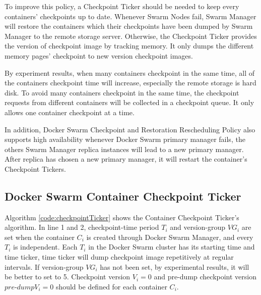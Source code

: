 To improve this policy, a Checkpoint Ticker should be needed to keep every containers' checkpoints up to date.
Whenever Swarm Nodes fail, Swarm Manager will restore the containers which their checkpoints have been dumped by Swarm Manager to the remote storage server.
Otherwise, the Checkpoint Ticker provides the version of checkpoint image by tracking memory. It only dumps the different memory pages' checkpoint to new version checkpoint images.

By experiment results, when many containers checkpoint in the same time, all of the containers checkpoint time will increase, especially the remote storage is hard disk.
To avoid many containers checkpoint in the same time, the checkpoint requests from different containers will be collected in a checkpoint queue.
It only allows one container checkpoint at a time.

In addition, Docker Swarm Checkpoint and Restoration Rescheduling Policy also supports high availability whenever Docker Swarm primary manager fails, the others Swarm Manager replica instances will lead to a new primary manager. After replica has chosen a new primary manager, it will restart the container's Checkpoint Tickers.

\subsection{Docker Swarm Container Checkpoint Ticker}
Algorithm \ref{code:checkpointTicker} shows the Container Checkpoint Ticker's algorithm.
In line 1 and 2, checkpoint-time period $T_i$ and version-group $VG_i$ are set when the container $C_i$ is created through Docker Swarm Manager, and every $T_i$ is independent.
Each $T_i$ in the Docker Swarm cluster has its starting time and time ticker, time ticker will dump checkpoint image repetitively at regular intervals. If version-group $VG_i$ has not been set, by experimental results, it will be better to set to 5.
Checkpoint version $V_i=0$ and pre-dump checkpoint version $pre$-$dump V_i=0$ should be defined for each container $C_i$.

